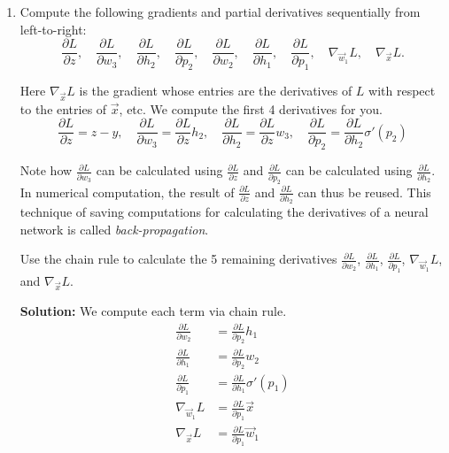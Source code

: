 \documentclass[10pt]{article}
\theoremstyle{definition}
\theoremstyle{plain}
\begin{document}
\begin{enumerate}[label=(\alph*)]
\item Compute the following gradients and partial derivatives sequentially from left-to-right:
\begin{equation}
\frac{\partial L}{\partial z}, \quad \frac{\partial L}{\partial w_3}, \quad \frac{\partial L}{\partial h_2}, \quad \frac{\partial L}{\partial p_2}, \quad \frac{\partial L}{\partial w_2}, \quad \frac{\partial L}{\partial h_1}, \quad \frac{\partial L}{\partial p_1}, \quad \nabla_{\vec{w}_1} L, \quad \nabla_{\vec{x}} L.
\end{equation}

Here $\nabla_{\vec{x}} L$ is the gradient whose entries are the derivatives of $L$ with respect to the entries of $\vec{x}$, etc. We compute the first 4 derivatives for you.
\begin{equation}
\frac{\partial L}{\partial z} = z - y, \quad \frac{\partial L}{\partial w_3} = \frac{\partial L}{\partial z} h_2, \quad \frac{\partial L}{\partial h_2} = \frac{\partial L}{\partial z} w_3, \quad \frac{\partial L}{\partial p_2} = \frac{\partial L}{\partial h_2} \sigma'(p_2)
\end{equation}

Note how $\frac{\partial L}{\partial w_3}$ can be calculated using $\frac{\partial L}{\partial z}$ and $\frac{\partial L}{\partial p_2}$ can be calculated using $\frac{\partial L}{\partial h_2}$. In numerical computation, the result of $\frac{\partial L}{\partial z}$ and $\frac{\partial L}{\partial h_2}$ can thus be reused. This technique of saving computations for calculating the derivatives of a neural network is called \emph{back-propagation}.

Use the chain rule to calculate the 5 remaining derivatives $\frac{\partial L}{\partial w_2}$, $\frac{\partial L}{\partial h_1}$, $\frac{\partial L}{\partial p_1}$, $\nabla_{\vec{w}_1} L$, and $\nabla_{\vec{x}} L$.

\textbf{Solution:} We compute each term via chain rule.
\begin{align}
\frac{\partial L}{\partial w_2} &= \frac{\partial L}{\partial p_2} h_1 \\
\frac{\partial L}{\partial h_1} &= \frac{\partial L}{\partial p_2} w_2 \\
\frac{\partial L}{\partial p_1} &= \frac{\partial L}{\partial h_1} \sigma'(p_1) \\
\nabla_{\vec{w}_1} L &= \frac{\partial L}{\partial p_1} \vec{x} \\
\nabla_{\vec{x}} L &= \frac{\partial L}{\partial p_1} \vec{w}_1
\end{align}


\end{enumerate}
\end{document}
